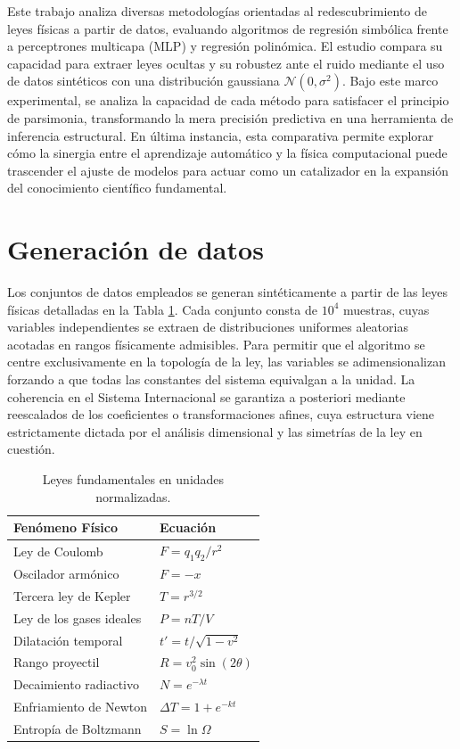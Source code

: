 \documentclass[11pt, a4paper]{article}
\begin{document}
Este trabajo analiza diversas metodologías orientadas al redescubrimiento de leyes físicas a partir de datos, evaluando algoritmos de regresión simbólica frente a perceptrones multicapa (MLP) y regresión polinómica. El estudio compara su capacidad para extraer leyes ocultas y su robustez ante el ruido mediante el uso de datos sintéticos con una distribución gaussiana $\mathcal{N}(0, \sigma^2)$. Bajo este marco experimental, se analiza la capacidad de cada método para satisfacer el principio de parsimonia, transformando la mera precisión predictiva en una herramienta de inferencia estructural. En última instancia, esta comparativa permite explorar cómo la sinergia entre el aprendizaje automático y la física computacional puede trascender el ajuste de modelos para actuar como un catalizador en la expansión del conocimiento científico fundamental.

\section{Generación de datos}
Los conjuntos de datos empleados se generan sintéticamente a partir de las leyes físicas detalladas en la Tabla \ref{tab:Leyes_Fisicas}. Cada conjunto consta de $10^{4}$ muestras, cuyas variables independientes se extraen de distribuciones uniformes aleatorias acotadas en rangos físicamente admisibles. Para permitir que el algoritmo se centre exclusivamente en la topología de la ley, las variables se adimensionalizan forzando a que todas las constantes del sistema equivalgan a la unidad. La coherencia en el Sistema Internacional se garantiza a posteriori mediante reescalados de los coeficientes o transformaciones afines, cuya estructura viene estrictamente dictada por el análisis dimensional y las simetrías de la ley en cuestión.

\FloatBarrier

\begin{table}[H]
\centering
\begin{tabular}{ll}
\toprule
\textbf{Fenómeno Físico} & \textbf{Ecuación} \\ 
\midrule
Ley de Coulomb & $F = q_1 q_2 / r^2$ \\
Oscilador armónico & $F = -x$ \\
Tercera ley de Kepler & $T = r^{3/2}$ \\
Ley de los gases ideales & $P = nT/V$ \\
Dilatación temporal & $t' = t / \sqrt{1 - v^2}$ \\
Rango proyectil & $R = v_0^2  \sin(2 \theta)$ \\
Decaimiento radiactivo & $N = e^{-\lambda t}$ \\
Enfriamiento de Newton & $\Delta T = 1 +e^{-kt}$ \\
Entropía de Boltzmann & $S = \ln \Omega$ \\
\bottomrule
\end{tabular}
\caption{Leyes fundamentales en unidades normalizadas.}
\label{tab:Leyes_Fisicas}
\end{table}
\end{document}

